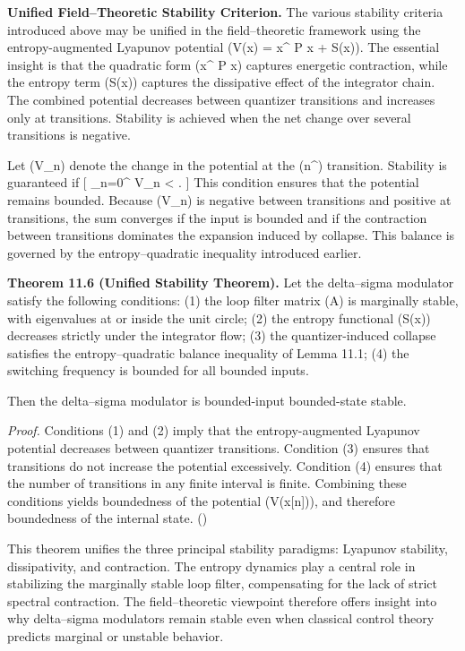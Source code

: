 \medskip

\textbf{Unified Field–Theoretic Stability Criterion.}
The various stability criteria introduced above may be unified in the field–theoretic framework using the entropy-augmented Lyapunov potential (V(x) = x^{\top} P x + \alpha S(x)). The essential insight is that the quadratic form (x^{\top} P x) captures energetic contraction, while the entropy term (S(x)) captures the dissipative effect of the integrator chain. The combined potential decreases between quantizer transitions and increases only at transitions. Stability is achieved when the net change over several transitions is negative.

Let (\Delta V_{n}) denote the change in the potential at the (n^{}) transition. Stability is guaranteed if
[
\sum_{n=0}^{\infty} \Delta V_{n} < \infty.
]
This condition ensures that the potential remains bounded. Because (\Delta V_{n}) is negative between transitions and positive at transitions, the sum converges if the input is bounded and if the contraction between transitions dominates the expansion induced by collapse. This balance is governed by the entropy–quadratic inequality introduced earlier.

\medskip

\textbf{Theorem 11.6 (Unified Stability Theorem).}
Let the delta–sigma modulator satisfy the following conditions:
(1) the loop filter matrix (A) is marginally stable, with eigenvalues at or inside the unit circle;
(2) the entropy functional (S(x)) decreases strictly under the integrator flow;
(3) the quantizer-induced collapse satisfies the entropy–quadratic balance inequality of Lemma 11.1;
(4) the switching frequency is bounded for all bounded inputs.

Then the delta–sigma modulator is bounded-input bounded-state stable.

\textit{Proof.}
Conditions (1) and (2) imply that the entropy-augmented Lyapunov potential decreases between quantizer transitions. Condition (3) ensures that transitions do not increase the potential excessively. Condition (4) ensures that the number of transitions in any finite interval is finite. Combining these conditions yields boundedness of the potential (V(x[n])), and therefore boundedness of the internal state. \hfill(\square)

\medskip

This theorem unifies the three principal stability paradigms: Lyapunov stability, dissipativity, and contraction. The entropy dynamics play a central role in stabilizing the marginally stable loop filter, compensating for the lack of strict spectral contraction. The field–theoretic viewpoint therefore offers insight into why delta–sigma modulators remain stable even when classical control theory predicts marginal or unstable behavior.

